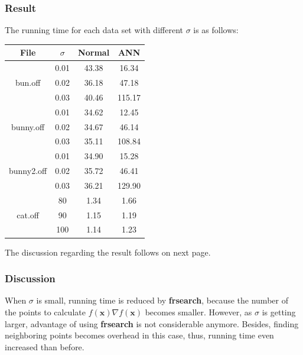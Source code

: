 \documentclass[paper=a4, fontsize=11pt]{scrartcl} %
\numberwithin{equation}{section} %
\numberwithin{figure}{section} %
\numberwithin{table}{section} %
\newcommand{\funcname}[1]{\textbf{#1}}
\renewcommand{\vec}[1]{\mathbf{#1}}
\begin{document}
\subsubsection{Result}

The running time for each data set with different $\sigma$ is as follows:

\begin{table}[h]
 \label{tab:title} 
\centering
\begin{tabular}{| c | c | c | c | }
\hline
					File 	& $\sigma$ 	& Normal	& ANN \\
\hline 
\multirow{3}{*}{bun.off}	& 0.01 		& 43.38		& 16.34 	 \\ \cline{2-4}
							& 0.02 		& 36.18		& 47.18 	 \\ \cline{2-4}
							& 0.03		& 40.46		& 115.17	 \\ \hline
\multirow{3}{*}{bunny.off}	& 0.01 		& 34.62		& 12.45  	\\ \cline{2-4}
							& 0.02 		& 34.67		& 46.14  	\\ \cline{2-4}
							& 0.03		& 35.11		& 108.84	 \\ \hline							
\multirow{3}{*}{bunny2.off}	& 0.01 		& 34.90		& 15.28  	\\ \cline{2-4}
							& 0.02 		& 35.72		& 46.41  	\\ \cline{2-4}
							& 0.03		& 36.21		& 129.90	 \\ \hline
\multirow{3}{*}{cat.off}	& 80 		& 1.34 		& 1.66  	\\ \cline{2-4}
							& 90 		& 1.15 		& 1.19  	\\ \cline{2-4}
							& 100		& 1.14 		& 1.23	 	\\ \hline
\end{tabular}
\end{table}

The discussion regarding the result follows on next page.

\subsubsection{Discussion}

When $\sigma$ is small, running time is reduced by \funcname{frsearch}, because the number of the points to calculate $f(\vec{x}) \nabla f(\vec{x})$ becomes smaller. However, as $\sigma$ is getting larger, advantage of using \funcname{frsearch} is not considerable anymore. Besides, finding neighboring points becomes overhead in this case, thus, running time even increased than before. 
\end{document}
